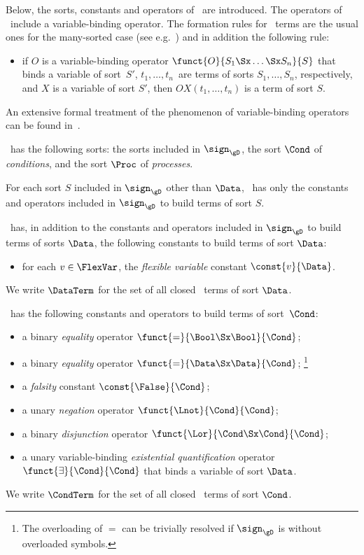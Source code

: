 \documentclass[runningheads]{llncs}
\begin{document}
Below, the sorts, constants and operators of \deACPei\ are introduced.
The operators of \deACPei\ include a variable-binding operator.
\sloppy
The formation rules for \mbox{\deACPei}\ terms are the usual ones for 
the many-sorted case (see e.g.~\cite{ST99a,Wir90a}) and in addition the 
following rule:
\begin{itemize}
\item
if $O$ is a variable-binding operator 
$\funct{O}{S_1 \Sx \ldots \Sx S_n}{S}$ that binds a variable of sort~$S'$,
$t_1,\ldots,t_n$~are terms of sorts $S_1,\ldots,S_n$, respectively, and 
$X$ is a variable of sort $S'$, then $O X (t_1,\ldots,t_n)$ is a term of 
sort $S$.
\end{itemize}
An extensive formal treatment of the phenomenon of variable-binding 
operators can be found in~\cite{PS95a}.

\deACPei\ has the following sorts: 
the sorts included in $\sign_\gD$,
the sort $\Cond$ of \emph{conditions}, and
the sort $\Proc$ of \emph{processes}.

For each sort $S$ included in $\sign_\gD$ other than $\Data$, 
\deACPei\ has only the constants and operators included in $\sign_\gD$ 
to build terms of sort $S$.

\deACPei\ has, in addition to the constants and operators included in 
$\sign_\gD$ to build terms of sorts $\Data$, the following constants to 
build terms of sort $\Data$:
\begin{itemize}
\item
for each $v \in \FlexVar$, the \emph{flexible variable} constant 
$\const{v}{\Data}$.
\end{itemize}
We write $\DataTerm$ for the set of all closed \deACPei\ terms of sort 
$\Data$.

\deACPei\ has the following constants and operators to build terms of 
sort~$\Cond$:
\begin{itemize}
\item
a binary \emph{equality} operator
$\funct{=}{\Bool \Sx \Bool}{\Cond}$;
\item
a binary \emph{equality} operator
$\funct{=}{\Data \Sx \Data}{\Cond}$;%
\footnote
{The overloading of $=$ can be trivially resolved if $\sign_\gD$ is
 without overloaded symbols.}
\item
a \emph{falsity} constant $\const{\False}{\Cond}$;
\item
a unary \emph{negation} operator $\funct{\Lnot}{\Cond}{\Cond}$;
\item
a binary \emph{disjunction} operator 
$\funct{\Lor}{\Cond \Sx \Cond}{\Cond}$;
\item
a unary variable-binding \emph{existential quantification} operator 
$\funct{\exists}{\Cond}{\Cond}$ that binds a variable of sort $\Data$. 
\end{itemize}
We write $\CondTerm$ for the set of all closed \deACPei\ terms of sort 
$\Cond$.
\end{document}
